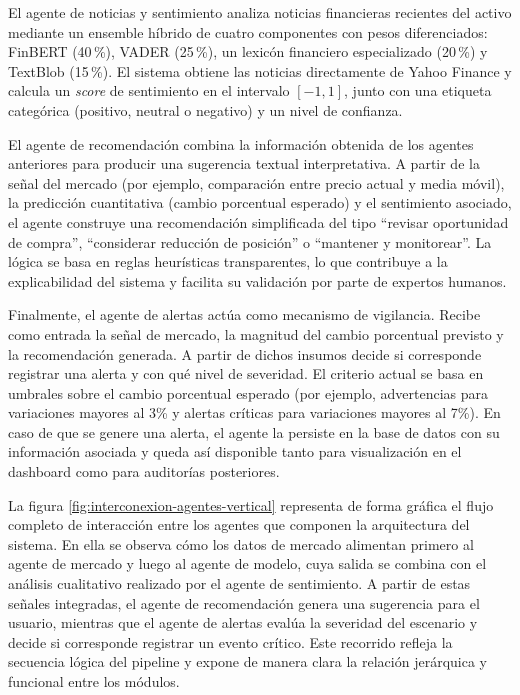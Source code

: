 El agente de noticias y sentimiento analiza noticias financieras recientes
del activo mediante un ensemble híbrido de cuatro componentes con pesos
diferenciados: FinBERT (40\,\%), VADER (25\,\%), un lexicón financiero
especializado (20\,\%) y TextBlob (15\,\%). El sistema obtiene las noticias
directamente de Yahoo Finance y calcula un \textit{score} de sentimiento en el intervalo $[-1, 1]$, junto con una etiqueta categórica (positivo, neutral o negativo) y un nivel de confianza.


El agente de recomendación combina la información obtenida de los agentes anteriores para producir una sugerencia textual interpretativa. A partir de la señal del mercado (por ejemplo, comparación entre precio actual y media móvil), la predicción cuantitativa (cambio porcentual esperado) y el sentimiento asociado, el agente construye una recomendación simplificada del tipo ``revisar oportunidad de compra'', ``considerar reducción de posición'' o ``mantener y monitorear''. La lógica se basa en reglas heurísticas transparentes, lo que contribuye a la explicabilidad del sistema y facilita su validación por parte de expertos humanos.

Finalmente, el agente de alertas actúa como mecanismo de vigilancia. Recibe como entrada la señal de mercado, la magnitud del cambio porcentual previsto y la recomendación generada. A partir de dichos insumos decide si corresponde registrar una alerta y con qué nivel de severidad. El criterio actual se basa en umbrales sobre el cambio porcentual esperado (por ejemplo, advertencias para variaciones mayores al 3\% y alertas críticas para variaciones mayores al 7\%). En caso de que se genere una alerta, el agente la persiste en la base de datos con su información asociada y queda así disponible tanto para visualización en el dashboard como para auditorías posteriores.

La figura \ref{fig:interconexion-agentes-vertical} representa de forma gráfica el flujo completo de interacción entre los agentes que componen la arquitectura del sistema. En ella se observa cómo los datos de mercado alimentan primero al agente de mercado y luego al agente de modelo, cuya salida se combina con el análisis cualitativo realizado por el agente de sentimiento. A partir de estas señales integradas, el agente de recomendación genera una sugerencia para el usuario, mientras que el agente de alertas evalúa la severidad del escenario y decide si corresponde registrar un evento crítico. Este recorrido refleja la secuencia lógica del pipeline y expone de manera clara la relación jerárquica y funcional entre los módulos.


